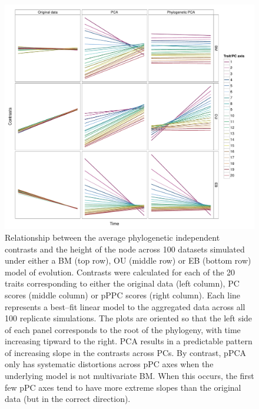 \documentclass[a4paper,12pt]{article}
\begin{document}
\begin{figure}[p]
\centering
\includegraphics[scale=0.65]{./fig/nh-3models.pdf}
\caption{Relationship between the average phylogenetic independent contrasts and the height of the node across 100 datasets simulated under either a BM (top row), OU (middle row) or EB (bottom row) model of evolution. Contrasts were calculated for each of the 20 traits corresponding to either the original data (left column), PC scores (middle column) or pPPC scores (right column). Each line represents a best--fit linear model to the aggregated data across all 100 replicate simulations. The plots are oriented so that the left side of each panel corresponds to the root of the phylogeny, with time increasing tipward to the right. PCA results in a predictable pattern of increasing slope in the contrasts across PCs. By contrast, pPCA only has systematic distortions across pPC axes when the underlying model is not multivariate BM. When this occurs, the first few pPC axes tend to have more extreme slopes than the original data (but in the correct direction).}
\label{nhplot}
\end{figure}
\end{document}
